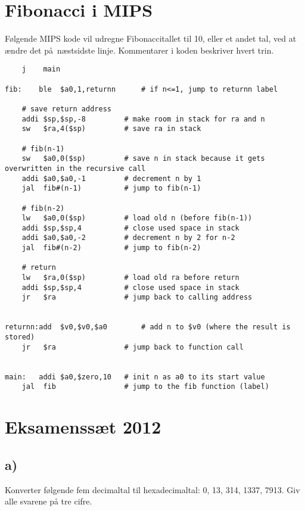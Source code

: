 \documentclass[a4paper,11pt]{article}
\date{\Large{19. marts 2013}}
\author{\huge{\Navn}\\\Skole\\Klasse \Klasse\\\Fag\\\\Vejleder: \Vejleder}
\title{\Huge{\Titel}}
\newcommand{\tb}[1]{\textbf{#1}\\}
\begin{document}
\frenchspacing

\newpage
\section*{Fibonacci i MIPS}
Følgende MIPS kode vil udregne Fibonaccitallet til 10, eller et andet tal, ved at ændre det på næstsidste linje. Kommentarer i koden beskriver hvert trin.
\begin{verbatim}
    j    main

fib:    ble  $a0,1,returnn      # if n<=1, jump to returnn label

    # save return address
    addi $sp,$sp,-8         # make room in stack for ra and n
    sw   $ra,4($sp)         # save ra in stack

    # fib(n-1)
    sw   $a0,0($sp)         # save n in stack because it gets overwritten in the recursive call
    addi $a0,$a0,-1         # decrement n by 1
    jal  fib#(n-1)          # jump to fib(n-1)

    # fib(n-2)
    lw   $a0,0($sp)         # load old n (before fib(n-1))
    addi $sp,$sp,4          # close used space in stack
    addi $a0,$a0,-2         # decrement n by 2 for n-2
    jal  fib#(n-2)          # jump to fib(n-2)

    # return
    lw   $ra,0($sp)         # load old ra before return
    addi $sp,$sp,4          # close used space in stack
    jr   $ra                # jump back to calling address


returnn:add  $v0,$v0,$a0        # add n to $v0 (where the result is stored)
    jr   $ra                # jump back to function call


main:   addi $a0,$zero,10   # init n as a0 to its start value
    jal  fib                # jump to the fib function (label)
\end{verbatim}

\section*{Eksamenssæt 2012}
\subsection*{a)}

Konverter følgende fem decimaltal til hexadecimaltal: 0, 13, 314, 1337, 7913. Giv alle svarene på tre cifre.
\end{document}
